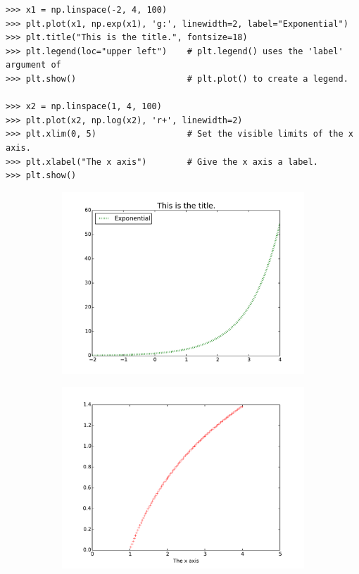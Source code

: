 \begin{lstlisting}
>>> x1 = np.linspace(-2, 4, 100)
>>> plt.plot(x1, np.exp(x1), 'g:', linewidth=2, label="Exponential")
>>> plt.title("This is the title.", fontsize=18)
>>> plt.legend(loc="upper left")    # plt.legend() uses the 'label' argument of
>>> plt.show()                      # plt.plot() to create a legend.

>>> x2 = np.linspace(1, 4, 100)
>>> plt.plot(x2, np.log(x2), 'r+', linewidth=2)
>>> plt.xlim(0, 5)                  # Set the visible limits of the x axis.
>>> plt.xlabel("The x axis")        # Give the x axis a label.
>>> plt.show()
\end{lstlisting}

\begin{figure}[H] %
\captionsetup[subfigure]{justification=centering}
\centering
\begin{subfigure}{.5\textwidth}
    \centering
    \includegraphics[width=\linewidth]{custom1.pdf}
    \label{fig:custom1}
\end{subfigure}%
\begin{subfigure}{.5\textwidth}
    \centering
    \includegraphics[width=\linewidth]{custom2.pdf}
    \label{fig:custom2}
\end{subfigure}
\label{fig:custom}
\end{figure}

